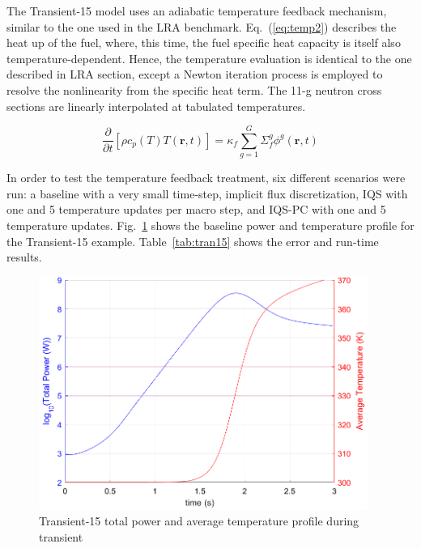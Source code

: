 \documentclass{elsarticle}
\renewcommand{\vec}[1]{\bm{#1}} %
\newcommand{\eqt}[1]{Eq.~(\ref{#1})}                     %
\newcommand{\fig}[1]{Fig.~\ref{#1}}                      %
\newcommand{\tbl}[1]{Table~\ref{#1}}                     %
\newcommand{\iqspc}{IQS-PC\xspace}
\newcommand{\be}{\begin{equation}}
\newcommand{\ee}{\end{equation}}
\begin{document}
The Transient-15 model uses an adiabatic temperature feedback mechanism, similar to the one used in the LRA benchmark.
\eqt{eq:temp2} describes the heat up of the fuel, where, this time, the fuel specific heat capacity is itself also temperature-dependent. Hence, the temperature evaluation is identical to the one described in LRA section, except a Newton iteration process is employed to resolve the nonlinearity from the specific heat term.  The 11-g neutron cross sections are linearly interpolated at tabulated temperatures.

\be
\frac{\partial }{\partial t}\left[\rho c_p(T)T(\vec{r},t)\right] = \kappa_f \sum^G_{g=1}\Sigma_f^g \phi^g(\vec{r},t)
\label{eq:temp2}
\ee



In order to test the temperature feedback treatment, six different scenarios were run: a baseline with a very small time-step, implicit flux discretization, IQS with one and 5 temperature updates per macro step, and \iqspc with one and 5 temperature updates.  \fig{fig:Tran15_profile} shows the baseline power and temperature profile for the Transient-15 example.  \tbl{tab:tran15} shows the error and run-time results.

\begin{figure}[htbp!]
\centering
\includegraphics[height=3in]{figures/Tran15_profile.png}
\caption{Transient-15 total power and average temperature profile during transient}
\label{fig:Tran15_profile}
\end{figure}
\end{document}
